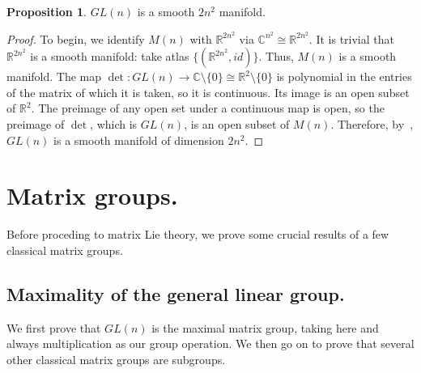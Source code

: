 \documentclass[12pt]{article}
\newcommand{\C}{\mathbb{C}}
\newcommand{\R}{\mathbb{R}}
\theoremstyle{definition}
\newtheorem{prop}[them]{Proposition}
\theoremstyle{definition}
\theoremstyle{definition}
\theoremstyle{definition}
\theoremstyle{definition}
\theoremstyle{definition}
\theoremstyle{definition}
\theoremstyle{definition}
\begin{document}
\begin{prop}
$GL(n)$ is a smooth $2n^2$ manifold.
\end{prop} 
\begin{proof}
To begin, we identify $M(n)$ with $\R^{2n^2}$
via $\C^{n^2} \cong \R^{2n^2}$. It is trivial that
$\R^{2n^2}$ is a smooth manifold: take
atlas $\{(\R^{2n^2}, id)\}$. Thus, $M(n)$ is a
smooth manifold. The map $\det: GL(n) \to
\C \setminus \{0\} \cong \R^2 \setminus \{0\}$ is polynomial in the entries
of the matrix of which it is taken, so it is
continuous. Its image is an open subset of $\R^2$.
The preimage of any open set under a continuous map
is open, so the preimage of $\det$, which is
$GL(n)$, is an open subset of $M(n)$. Therefore,
by~, $GL(n)$ is a smooth manifold of
dimension $2n^2$.
\end{proof}

\section{Matrix groups.}

\par{Before proceding to matrix Lie theory, we prove some crucial results of a few classical matrix groups.}

\subsection{Maximality of the general linear group.}

\par{We first prove that $GL(n)$ is the maximal matrix group, taking here and always multiplication as our group operation. We then go on to prove that several other classical matrix groups are subgroups.}
\end{document}
